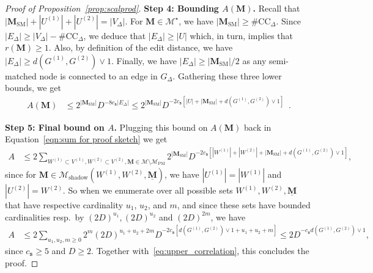 \documentclass[final]{colt2026}
\newcommand{\1}{\mathbf{1}}
\begin{document}
\begin{proof}[Proof of Proposition~\ref{prop:scalprod}]
\noindent
{\bf Step 4: Bounding $A(\mathbf M)$.}  Recall that $|\mathbf{M}_{\mathrm{SM}}| + |U^{(1)}| + |U^{(2)}| = |V_{\Delta}|$.
For $\mathbf{M}\in \mathcal{M}^\star$, we have $|\mathbf{M}_{\mathrm{SM}}|\geq  \#\mathrm{CC}_{\Delta}$. 
Since $|E_{\Delta}|\geq |V_{\Delta}|- \#\mathrm{CC}_{\Delta}$, we deduce that $|E_{\Delta}|\geq |U|$ which, in turn, implies that $r(\mathbf M)\geq 1$.  
Also, by definition of the edit distance, we have $|E_{\Delta}| \geq d(G^{(1)}, G^{(2)})\vee 1$. Finally, we have $|E_{\Delta}| \geq |\mathbf{M}_{\mathrm{SM}}| /2$ as any semi-matched node is connected to an edge in $G_{\Delta}$. Gathering these three lower bounds, we get 
\begin{align*}
    A(\mathbf M) &\leq 2^{|\mathbf M_{\mathrm{SM}}|} D^{-8c_{\texttt{s}}|E_\Delta|} \leq 2^{|\mathbf M_{\mathrm{SM}}|}D^{-2c_{\texttt{s}}[|U|+ |\mathbf{M}_{\mathrm{SM}}|+ d(G^{(1)},G^{(2)})\vee 1]}\enspace .
\end{align*}





\noindent
{\bf Step 5: Final bound on $A$.} Plugging this bound on $A(\mathbf M)$ back in Equation~\eqref{eqn:sum for proof sketch} we get
\begin{align}
       A &\leq  2 
       \sum_{W^{(1)} \subset V^{(1)}, W^{(2)} \subset V^{(2)}, \underline{\mathbf M} \in \mathcal M\setminus \mathcal M_{\mathrm{PM}}}  2^{|\mathbf M_{\mathrm{SM}}|} D^{-2c_{\texttt{s}}[|W^{(1)}|+ |W^{(2)}|+ |\mathbf{M}_{\mathrm{SM}}|+ d(G^{(1)},G^{(2)})\vee 1]}, 
\end{align}
since for $\mathbf M\in \mathcal M_{\mathrm{shadow}}(W^{(1)},W^{(2)}, \underline{\mathbf M})$, we have $|U^{(1)}|= |W^{(1)}|$ and $|U^{(2)}|=W^{(2)}$. 
So when we enumerate over all possible sets $W^{(1)}, W^{(2)}, \underline{\mathbf M} $ that have respective cardinality $u_1$, $u_2$, and  $m$, and since these sets have bounded cardinalities resp.~by $(2D)^{u_1}, (2D)^{u_2}$ and $(2D)^{2m}$, we have
\begin{align*}
       A &\leq  2
       \sum_{u_1, u_2, m \geq 0}2^m(2D)^{u_1+u_2+2m}  D^{-2c_{\texttt{s}}\left[d(G^{(1)}, G^{(2)})\vee 1+u_1+u_2+m\right]} \leq 2D^{-c_{\texttt{s}}  d(G^{(1)},G^{(2)})\vee 1},
\end{align*}
since $c_{\texttt{s}} \geq 5$ and $D \geq 2$. Together with~\eqref{eq:upper_correlation}, this concludes the proof.  
\end{proof}
\end{document}
